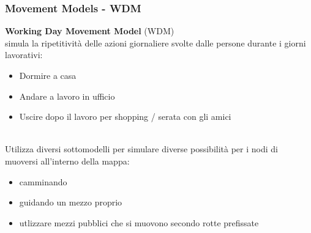 \documentclass{beamer}
\begin{document}
\begin{frame}
\frametitle{Movement Models - WDM}
\label{WDM}
\textbf{Working Day Movement Model} (WDM)\\
simula la ripetitività delle azioni giornaliere svolte dalle persone durante i giorni lavorativi:
\begin{itemize}
\item Dormire a casa
\item Andare a lavoro in ufficio
\item Uscire dopo il lavoro per shopping / serata con gli amici
\end{itemize}
\ \\
\pause
Utilizza diversi sottomodelli per simulare diverse possibilità per i nodi di muoversi all'interno della mappa:
\begin{itemize}
\item camminando
\item guidando un mezzo proprio
\item utlizzare mezzi pubblici che si muovono secondo rotte prefissate
\end{itemize}
\end{frame}
\end{document}
